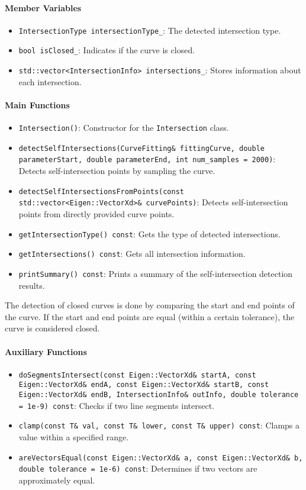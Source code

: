 \documentclass[a4paper]{article}
\begin{document}
\begin{sloppypar}
\paragraph*{Member Variables}
\begin{itemize}
  \item \verb|IntersectionType intersectionType_|: The detected intersection type.
  \item \verb|bool isClosed_|: Indicates if the curve is closed.
  \item \verb|std::vector<IntersectionInfo> intersections_|: Stores information about each intersection.
\end{itemize}

\paragraph*{Main Functions}
\begin{itemize}
  \item \verb|Intersection()|: Constructor for the \verb|Intersection| class.
  \item \lstinline|detectSelfIntersections(CurveFitting& fittingCurve, double parameterStart, double parameterEnd, int num_samples = 2000)|: Detects self-intersection points by sampling the curve.
  \item \lstinline|detectSelfIntersectionsFromPoints(const std::vector<Eigen::VectorXd>& curvePoints)|: Detects self-intersection points from directly provided curve points.
  \item \verb|getIntersectionType() const|: Gets the type of detected intersections.
  \item \verb|getIntersections() const|: Gets all intersection information.
  \item \verb|printSummary() const|: Prints a summary of the self-intersection detection results.
\end{itemize}

The detection of closed curves is done by comparing the start and end points of the curve. If the start and end points are equal (within a certain tolerance), the curve is considered closed.

\paragraph*{Auxiliary Functions}
\begin{itemize}
  \item \lstinline|doSegmentsIntersect(const Eigen::VectorXd& startA, const Eigen::VectorXd& endA, const Eigen::VectorXd& startB, const Eigen::VectorXd& endB, IntersectionInfo& outInfo, double tolerance = 1e-9) const|: Checks if two line segments intersect.
  \item \verb|clamp(const T& val, const T& lower, const T& upper) const|: Clamps a value within a specified range.
  \item \lstinline|areVectorsEqual(const Eigen::VectorXd& a, const Eigen::VectorXd& b, double tolerance = 1e-6) const|: Determines if two vectors are approximately equal.
\end{itemize}


\end{sloppypar}
\end{document}
